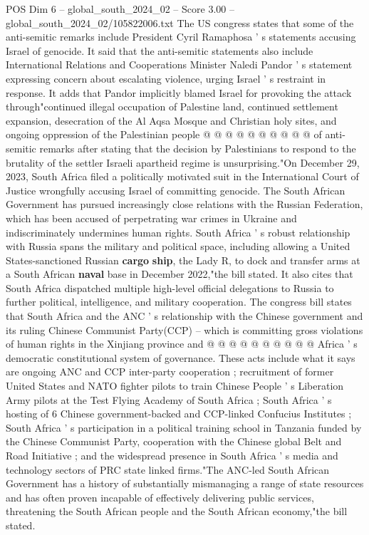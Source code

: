 \begin{textsample}{POS Dim 6 – global\_south\_2024\_02 – Score 3.00 – global\_south\_2024\_02/105822006.txt}
The US congress states that some of the anti-semitic remarks include President Cyril Ramaphosa ' s statements accusing Israel of genocide.
It said that the anti-semitic statements also include International Relations and Cooperations Minister Naledi Pandor ' s statement expressing concern about escalating violence, urging Israel ' s restraint in response.
It adds that Pandor implicitly blamed Israel for provoking the attack through"continued illegal occupation of Palestine land, continued settlement expansion, desecration of the Al Aqsa Mosque and Christian holy sites, and ongoing oppression of the Palestinian people @ @ @ @ @ @ @ @ @ @ of anti-semitic remarks after stating that the decision by Palestinians to respond to the brutality of the settler Israeli apartheid regime is unsurprising."On December 29, 2023, South Africa filed a politically motivated suit in the International Court of Justice wrongfully accusing Israel of committing genocide.
The South African Government has pursued increasingly close relations with the Russian Federation, which has been accused of perpetrating war crimes in Ukraine and indiscriminately undermines human rights.
South Africa ' s robust relationship with Russia spans the military and political space, including allowing a United States-sanctioned Russian \textbf{cargo} \textbf{ship}, the Lady R, to dock and transfer arms at a South African \textbf{naval} base in December 2022,"the bill stated.
It also cites that South Africa dispatched multiple high-level official delegations to Russia to further political, intelligence, and military cooperation.
The congress bill states that South Africa and the ANC ' s relationship with the Chinese government and its ruling Chinese Communist Party(CCP) -- which is committing gross violations of human rights in the Xinjiang province and @ @ @ @ @ @ @ @ @ @ Africa ' s democratic constitutional system of governance.
These acts include what it says are ongoing ANC and CCP inter-party cooperation ; recruitment of former United States and NATO fighter pilots to train Chinese People ' s Liberation Army pilots at the Test Flying Academy of South Africa ; South Africa ' s hosting of 6 Chinese government-backed and CCP-linked Confucius Institutes ; South Africa ' s participation in a political training school in Tanzania funded by the Chinese Communist Party, cooperation with the Chinese global Belt and Road Initiative ; and the widespread presence in South Africa ' s media and technology sectors of PRC state linked firms."The ANC-led South African Government has a history of substantially mismanaging a range of state resources and has often proven incapable of effectively delivering public services, threatening the South African people and the South African economy,"the bill stated.

\end{textsample}

